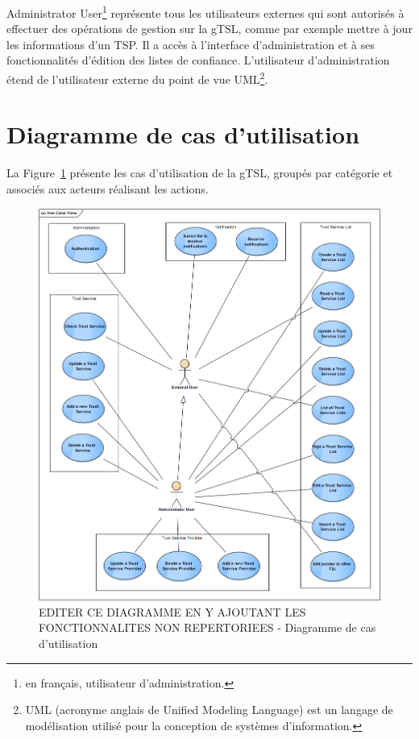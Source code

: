 \documentclass{tnreport}
\begin{document}
Administrator User\footnote{en français, utilisateur d'administration.} représente tous les utilisateurs externes qui sont autorisés à effectuer des opérations de gestion sur la gTSL, comme par exemple mettre à jour les informations d'un TSP. Il a accès à l'interface d'administration et à ses fonctionnalités d'édition des listes de confiance. L'utilisateur d'administration étend de l'utilisateur externe du point de vue UML\footnote{UML (acronyme anglais de Unified Modeling Language) est un langage de modélisation utilisé pour la conception de systèmes d'information.}.

\section{Diagramme de cas d'utilisation}

La Figure~\ref{fig:use-case-diagram} présente les cas d'utilisation de la gTSL, groupés par catégorie et associés aux acteurs réalisant les actions.

\begin{figure}[h]
	\centering
	\includegraphics[scale=0.55]{figures/use-case-diagram}
	\caption{EDITER CE DIAGRAMME EN Y AJOUTANT LES FONCTIONNALITES NON REPERTORIEES - Diagramme de cas d'utilisation \cite{design-document}}
	\label{fig:use-case-diagram}
\end{figure}
\clearpage
\end{document}
